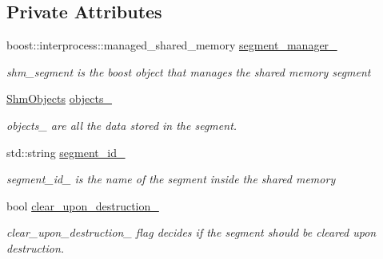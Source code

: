 \subsection*{Private Attributes}
\begin{DoxyCompactItemize}
\item 
boost\+::interprocess\+::managed\+\_\+shared\+\_\+memory \hyperlink{classshared__memory_1_1SharedMemorySegment_af775c0982687b6e9bc9856b21aa1e009}{segment\+\_\+manager\+\_\+}\hypertarget{classshared__memory_1_1SharedMemorySegment_af775c0982687b6e9bc9856b21aa1e009}{}\label{classshared__memory_1_1SharedMemorySegment_af775c0982687b6e9bc9856b21aa1e009}

\begin{DoxyCompactList}\small\item\em shm\+\_\+segment is the boost object that manages the shared memory segment \end{DoxyCompactList}\item 
\hyperlink{namespaceshared__memory_ae50b2192256821112a69e47d5314b467}{Shm\+Objects} \hyperlink{classshared__memory_1_1SharedMemorySegment_a8c4d0eb6f2a620bf7e5b22a57c07380b}{objects\+\_\+}
\begin{DoxyCompactList}\small\item\em objects\+\_\+ are all the data stored in the segment. \end{DoxyCompactList}\item 
std\+::string \hyperlink{classshared__memory_1_1SharedMemorySegment_a08408dc6b860388eb3b08e493f0188d9}{segment\+\_\+id\+\_\+}\hypertarget{classshared__memory_1_1SharedMemorySegment_a08408dc6b860388eb3b08e493f0188d9}{}\label{classshared__memory_1_1SharedMemorySegment_a08408dc6b860388eb3b08e493f0188d9}

\begin{DoxyCompactList}\small\item\em segment\+\_\+id\+\_\+ is the name of the segment inside the shared memory \end{DoxyCompactList}\item 
bool \hyperlink{classshared__memory_1_1SharedMemorySegment_af50ac70dca284926b15803f86958b220}{clear\+\_\+upon\+\_\+destruction\+\_\+}
\begin{DoxyCompactList}\small\item\em clear\+\_\+upon\+\_\+destruction\+\_\+ flag decides if the segment should be cleared upon destruction. \end{DoxyCompactList}\end{DoxyCompactItemize}


